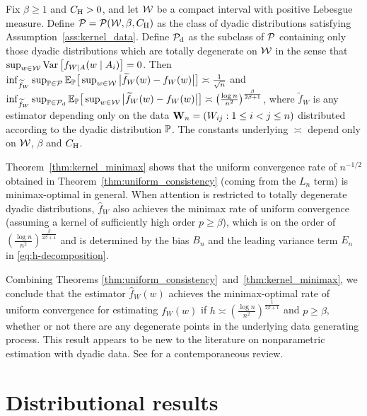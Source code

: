\begin{theorem} \label{thm:kernel_minimax}

  Fix $\beta \geq 1$ and $\CH > 0$,
  and let $\cW$ be a compact interval with positive Lebesgue measure.
  Define $\cP = \cP(\cW, \beta, \CH)$
  as the class of dyadic distributions
  satisfying Assumption~\ref{ass:kernel_data}.
  Define $\cPd$ as the subclass of $\cP$
  containing only those dyadic distributions
  which are totally degenerate on $\cW$ in the sense that
  $\sup_{w \in \cW} \Var\left[f_{W \mid A}(w \mid A_i)\right] = 0$.
  Then
  $\inf_{\widetilde f_W} \sup_{\P \in \cP}
  \E_\P\big[\sup_{w \in \cW} \big| \widetilde f_W(w) - f_W(w) \big| \big]
  \asymp \frac{1}{\sqrt n}$
  and
  $\inf_{\widetilde f_W} \sup_{\P \in \cPd}
  \E_\P\big[\sup_{w \in \cW} \big| \widetilde f_W(w) - f_W(w) \big| \big]
  \asymp \big( \frac{\log n}{n^2} \big)^{\frac{\beta}{2\beta+1}}$,
  where $\widetilde f_W$ is any estimator depending only on
  the data $\bW_n = (W_{ij}: 1 \leq i < j \leq n)$
  distributed according to the dyadic distribution $\P$.
  The constants underlying $\asymp$ depend only on
  $\cW$, $\beta$ and $\CH$.

\end{theorem}

Theorem~\ref{thm:kernel_minimax} shows that the uniform convergence rate of
$n^{-1/2}$
obtained in Theorem~\ref{thm:uniform_consistency}
(coming from the $L_n$ term) is minimax-optimal in general.
When attention is restricted to totally degenerate dyadic distributions,
$\widehat f_W$ also achieves the minimax rate of uniform convergence
(assuming a kernel of sufficiently high order $p \geq \beta$),
which is on the order of
$\left(\frac{\log n}{n^2}\right)^{\frac{\beta}{2\beta+1}}$ and
is determined by the bias $B_n$ and the leading variance term $E_n$ in
\eqref{eq:h-decomposition}.

Combining Theorems \ref{thm:uniform_consistency}~and~\ref{thm:kernel_minimax},
we
conclude that the estimator $\widehat{f}_W(w)$ achieves the minimax-optimal rate
of uniform convergence for estimating $f_W(w)$ if
$h \asymp \left( \frac{\log n}{n^2} \right)^{\frac{1}{2\beta+1}}$
and $p \geq \beta$,
whether or not there are
any degenerate points in the underlying data generating process.
This result appears to be new to the literature on
nonparametric estimation with dyadic data.
See \citet{gao2021minimax} for a contemporaneous review.

\section{Distributional results}\label{sec:kernel_inference}


